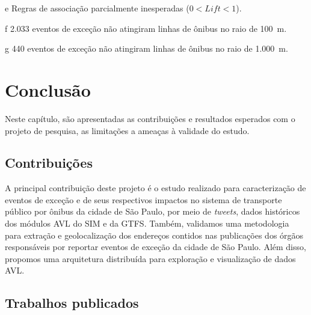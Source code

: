 \documentclass[
	12pt,				%
	oneside,			%
	a4paper,			%
	english,			%
	brazil				%
	]{abntex2ppgsi}
\begin{document}
{{{\begin{table}[!htb]
\begin{threeparttable}
\begin{tablenotes}
            \item[e] Regras de associação parcialmente inesperadas ($0 < Lift < 1$).
            \item[f] 2.033 eventos de exceção não atingiram linhas de ônibus no raio de 100~m.
            \item[g] 440 eventos de exceção não atingiram linhas de ônibus no raio de 1.000~m.
        \end{tablenotes}
\end{threeparttable}
\end{table}



\chapter{Conclusão}
\label{conclusion}

Neste capítulo, são apresentadas as contribuições e resultados esperados com o projeto de pesquisa, as limitações a ameaças à validade do estudo. 

\section{Contribuições}

A principal contribuição deste projeto é o estudo realizado para caracterização de eventos de exceção e de seus respectivos impactos no sistema de transporte público por ônibus da cidade de São Paulo, por meio de \textit{tweets}, dados históricos dos módulos AVL do SIM e da GTFS. %
Também, validamos uma metodologia para extração e geolocalização dos endereços contidos nas publicações dos órgãos responsáveis por reportar eventos de exceção da cidade de São Paulo. Além disso, propomos uma arquitetura distribuída para exploração e visualização de dados AVL.

\section{Trabalhos publicados}

}}}
\end{document}

